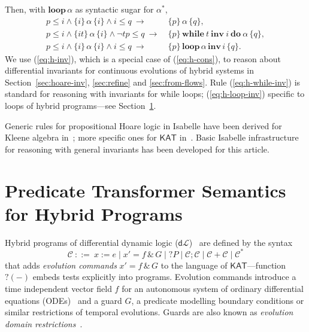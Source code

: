 \documentclass[envcountsames]{llncs}
\newcommand{\WHILEI}[3]{\mathbf{while}\ #1\ \mathbf{inv}\ #2\ \mathbf{do}\ #3}
\newcommand{\KAT}{\mathsf{KAT}}
\newcommand{\dL}{\mathsf{d}\mathcal{L}}
\begin{document}
Then, with $\mathbf{loop}\, \alpha$ as syntactic sugar for $\alpha^\ast$,
\begin{align}
  p\le i \land \{i\}\, \alpha\, \{i\}\land i\le q\ \rightarrow\
  &\{p\}\, \alpha\, \{q\},\label{eq:h-inv}\tag{h-inv}\\
  p \le i \wedge \{it\}\, \alpha\, \{i\} \wedge \neg t p\le q\
  \rightarrow \ & \{p\}\, \WHILEI{t}{i}{\alpha}\,  \{q\},\label{eq:h-while-inv}\tag{h-while-inv}\\
   p\le i \land \{i\}\, \alpha\, \{i\}\land i\le q\ \rightarrow\ &
                                                                   \{p\}\, \mathbf{loop}\, \alpha\,
    \mathbf{inv}\, i\, \{q\}. \label{eq:h-loop-inv}\tag{h-loop-inv}
\end{align}
We use (\ref{eq:h-inv}), which is a special case of (\ref{eq:h-cons}),
to reason about differential invariants for continuous evolutions of
hybrid systems in Section~\ref{sec:hoare-inv}, \ref{sec:refine} and
\ref{sec:from-flows}. Rule (\ref{eq:h-while-inv}) is standard for
reasoning with invariants for while loops; (\ref{eq:h-loop-inv})
specific to loops of hybrid programs---see
Section~\ref{sec:sta-hybrid}.

Generic rules for propositional Hoare logic in Isabelle have been
derived for Kleene algebra in~\cite{afp:ka}; more specific ones for
$\KAT$ in~\cite{afp:kat,afp:vericomp}. Basic Isabelle infrastructure for
reasoning with general invariants has been developed for this
article. 



\section{Predicate Transformer Semantics for Hybrid Programs}\label{sec:sta-hybrid}

Hybrid programs of differential dynamic logic ($\dL$)~\cite{Platzer10} are defined by the syntax
\begin{equation*}
\mathcal{C}\ ::= \ x:=e \mid x' = f \, \&\, G \mid ?P\mid \mathcal{C};\mathcal{C}\mid \mathcal{C}+\mathcal{C}\mid \mathcal{C}^*
\end{equation*}
that adds \emph{evolution commands} $x' = f \, \&\, G$ to the language
of $\KAT$---function $?(-)$ embeds tests explicitly into programs.
Evolution commands introduce a time independent vector field $f$ for
an autonomous system of ordinary differential equations
(ODEs)~\cite{Hirsch09,Teschl12} and a guard $G$, a predicate modelling
boundary conditions or similar restrictions of temporal
evolutions. Guards are also known as \emph{evolution domain
  restrictions}~\cite{DoyenFPP18}.
\end{document}
